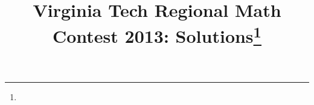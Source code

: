 \documentclass[10pt]{article}
\begin{document}
\title{Virginia Tech Regional Math Contest 2013: Solutions\footnote{\disclaimer}}
\author{\vspace{-2ex}}
\date{\vspace{-5ex}} %
\maketitle

%

%

%

%

%

%

%
\end{document}
